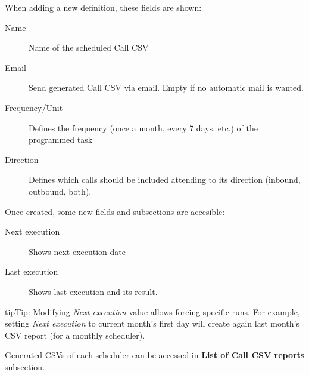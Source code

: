 \documentclass[letterpaper,10pt,english]{sphinxmanual}
\begin{document}
When adding a new definition, these fields are shown:
\begin{description}
\item[{Name}] \leavevmode{}\label{administration_portal/client/wholesale/calls/call_csv_schedulers:term-name}
Name of the scheduled Call CSV

\item[{Email}] \leavevmode{}\label{administration_portal/client/wholesale/calls/call_csv_schedulers:term-email}
Send generated Call CSV via email. Empty if no automatic mail is wanted.

\item[{Frequency/Unit}] \leavevmode{}\label{administration_portal/client/wholesale/calls/call_csv_schedulers:term-frequency-unit}
Defines the frequency (once a month, every 7 days, etc.) of the programmed task

\item[{Direction}] \leavevmode{}\label{administration_portal/client/wholesale/calls/call_csv_schedulers:term-direction}
Defines which calls should be included attending to its direction (inbound, outbound, both).

\end{description}

Once created, some new fields and subsections are accesible:
\begin{description}
\item[{Next execution}] \leavevmode{}\label{administration_portal/client/wholesale/calls/call_csv_schedulers:term-next-execution}
Shows next execution date

\item[{Last execution}] \leavevmode{}\label{administration_portal/client/wholesale/calls/call_csv_schedulers:term-last-execution}
Shows last execution and its result.

\end{description}

\begin{notice}{tip}{Tip:}
Modifying \emph{Next execution} value allows forcing specific runs. For example, setting \emph{Next execution} to
current month's first day will create again last month's CSV report (for a monthly scheduler).
\end{notice}

Generated CSVs of each scheduler can be accessed in \textbf{List of Call CSV reports} subsection.
\end{document}
